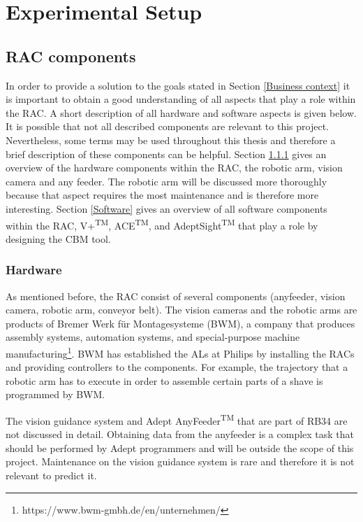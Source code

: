 \chapter{Experimental Setup} \label{Chapter4}

\section{RAC components} \label{RAC components}
In order to provide a solution to the goals stated in Section \ref{Business context} it is important to obtain a good understanding of all aspects that play a role within the RAC. A short description of all hardware and software aspects is given below. It is possible that not all described components are relevant to this project. Nevertheless, some terms may be used throughout this thesis and therefore a brief description of these components can be helpful. Section \ref{Hardware} gives an overview of the hardware components within the RAC, the robotic arm, vision camera and any feeder. The robotic arm will be discussed more thoroughly because that aspect requires the most maintenance and is therefore more interesting. Section \ref{Software} gives an overview of all software components within the RAC, V+\textsuperscript{\tiny{TM}}, ACE\textsuperscript{\tiny{TM}}, and AdeptSight\textsuperscript{\tiny{TM}} that play a role by designing the CBM tool.

\subsection{Hardware} \label{Hardware}
As mentioned before, the RAC consist of several components (anyfeeder, vision camera, robotic arm, conveyor belt). The vision cameras and the robotic arms are products of Bremer Werk für Montagesysteme (BWM), a company that produces assembly systems, automation systems, and special-purpose machine manufacturing\footnote{https://www.bwm-gmbh.de/en/unternehmen/}. BWM has established the ALs at Philips by installing the RACs and providing controllers to the components. For example, the trajectory that a robotic arm has to execute in order to assemble certain parts of a shave is programmed by BWM. 

The vision guidance system and Adept AnyFeeder\textsuperscript{\tiny{TM}} that are part of RB34 are not discussed in detail. Obtaining data from the anyfeeder is a complex task that should be performed by Adept programmers and will be outside the scope of this project. Maintenance on the vision guidance system is rare and therefore it is not relevant to predict it.  

